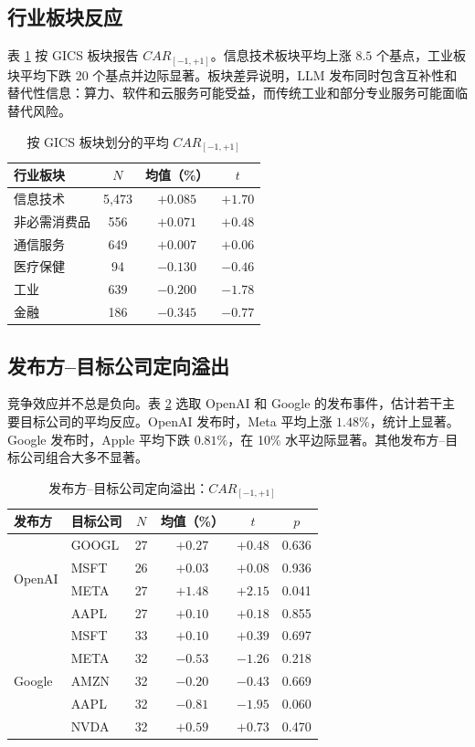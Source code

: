 \documentclass[11pt,fontset=fandol]{ctexart}
\begin{document}
\subsection{行业板块反应}

表 \ref{tab:industry_car} 按 GICS 板块报告 $CAR_{[-1,+1]}$。信息技术板块平均上涨 $8.5$ 个基点，工业板块平均下跌 $20$ 个基点并边际显著。板块差异说明，LLM 发布同时包含互补性和替代性信息：算力、软件和云服务可能受益，而传统工业和部分专业服务可能面临替代风险。

\begin{table}[htbp]
\centering
\caption{按 GICS 板块划分的平均 $CAR_{[-1,+1]}$}
\label{tab:industry_car}
\small
\begin{tabular}{lccc}
\toprule
行业板块 & $N$ & 均值（\%） & $t$ \\
\midrule
信息技术     & 5{,}473 & $+0.085$ & $+1.70$ \\
非必需消费品 & 556 & $+0.071$ & $+0.48$ \\
通信服务     & 649 & $+0.007$ & $+0.06$ \\
医疗保健     & 94  & $-0.130$ & $-0.46$ \\
工业         & 639 & $-0.200$ & $-1.78$ \\
金融         & 186 & $-0.345$ & $-0.77$ \\
\bottomrule
\end{tabular}
\end{table}

\subsection{发布方--目标公司定向溢出}

竞争效应并不总是负向。表 \ref{tab:pairwise} 选取 OpenAI 和 Google 的发布事件，估计若干主要目标公司的平均反应。OpenAI 发布时，Meta 平均上涨 $1.48\%$，统计上显著。Google 发布时，Apple 平均下跌 $0.81\%$，在 10\% 水平边际显著。其他发布方--目标公司组合大多不显著。

\begin{table}[htbp]
\centering
\caption{发布方--目标公司定向溢出：$CAR_{[-1,+1]}$}
\label{tab:pairwise}
\small
\begin{tabular}{llcccc}
\toprule
发布方 & 目标公司 & $N$ & 均值（\%） & $t$ & $p$ \\
\midrule
\multirow{4}{*}{OpenAI}
 & GOOGL & 27 & $+0.27$ & $+0.48$ & 0.636 \\
 & MSFT  & 26 & $+0.03$ & $+0.08$ & 0.936 \\
 & META  & 27 & $+1.48$ & $+2.15$ & 0.041 \\
 & AAPL  & 27 & $+0.10$ & $+0.18$ & 0.855 \\
\midrule
\multirow{5}{*}{Google}
 & MSFT  & 33 & $+0.10$ & $+0.39$ & 0.697 \\
 & META  & 32 & $-0.53$ & $-1.26$ & 0.218 \\
 & AMZN  & 32 & $-0.20$ & $-0.43$ & 0.669 \\
 & AAPL  & 32 & $-0.81$ & $-1.95$ & 0.060 \\
 & NVDA  & 32 & $+0.59$ & $+0.73$ & 0.470 \\
\bottomrule
\end{tabular}
\end{table}
\end{document}
